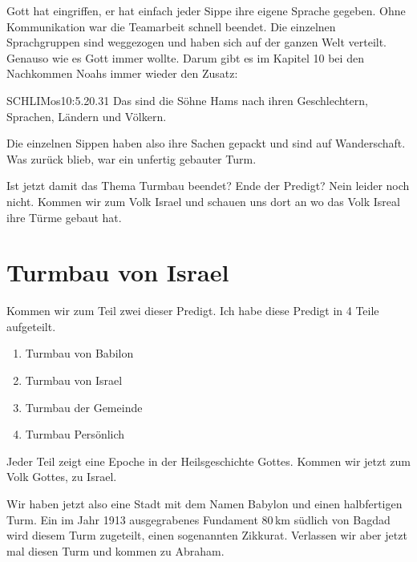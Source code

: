 \documentclass[fontsize=16pt]{mybib}
\begin{document}
\begin{otsblock}
    Gott hat eingriffen, er hat einfach jeder Sippe ihre eigene Sprache gegeben. Ohne Kommunikation war die Teamarbeit schnell beendet. Die einzelnen Sprachgruppen sind weggezogen und haben sich auf der ganzen Welt verteilt. Genauso wie es Gott immer wollte.
    Darum gibt es im Kapitel 10 bei den Nachkommen Noahs immer wieder den Zusatz:
    \begin{bibelbox}{SCHL}{IMos}{10:5.20.31}
        Das sind die Söhne Hams nach ihren Geschlechtern, Sprachen, Ländern und Völkern.
    \end{bibelbox}    
    
    Die einzelnen Sippen haben also ihre Sachen gepackt und sind auf Wanderschaft. Was zurück blieb, war ein unfertig gebauter Turm.
\end{otsblock}
\begin{otsblock}
    Ist jetzt damit das Thema Turmbau beendet? Ende der Predigt? Nein leider noch nicht. Kommen wir zum Volk Israel und schauen uns dort an wo das Volk Isreal ihre Türme gebaut hat.
    
    \section{Turmbau von Israel}
    Kommen wir zum Teil zwei dieser Predigt. Ich habe diese Predigt in 4 Teile aufgeteilt.  
    \begin{enumerate}
        \item Turmbau von Babilon
        \item Turmbau von Israel
        \item Turmbau der Gemeinde
        \item Turmbau Persönlich
    \end{enumerate}
    Jeder Teil zeigt eine Epoche in der Heilsgeschichte Gottes. Kommen wir jetzt zum Volk Gottes, zu Israel.
\end{otsblock}
\begin{otsblock}
    Wir haben jetzt also eine Stadt mit dem Namen Babylon und einen halbfertigen Turm. Ein im Jahr 1913 ausgegrabenes Fundament 80\,km südlich von Bagdad wird diesem Turm zugeteilt, einen sogenannten Zikkurat. Verlassen wir aber jetzt mal diesen Turm und kommen zu Abraham.
\end{otsblock}
\end{document}
